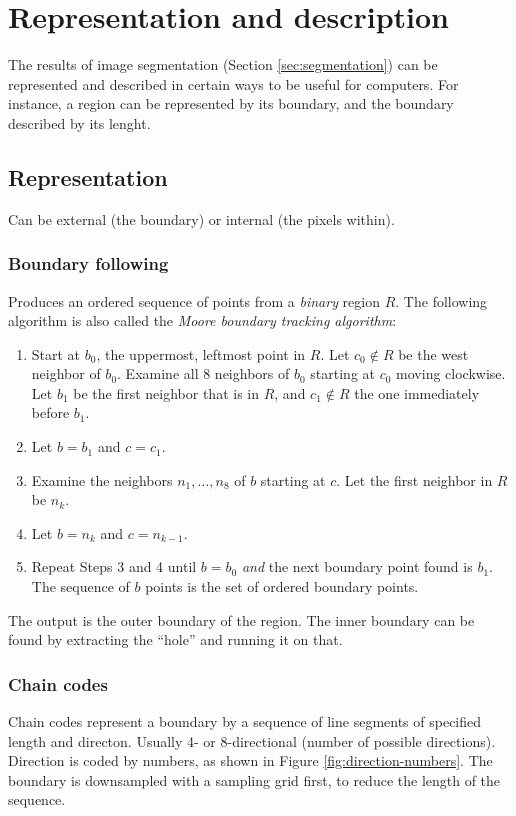 \section{Representation and description}
The results of image segmentation (Section \ref{sec:segmentation}) can be represented and described in certain ways to be useful for computers. For instance, a region can be represented by its boundary, and the boundary described by its lenght.

\subsection{Representation}
Can be external (the boundary) or internal (the pixels within).

\subsubsection{Boundary following}
Produces an ordered sequence of points from a \emph{binary} region $R$. The following algorithm is also called the \emph{Moore boundary tracking algorithm}:
\begin{enumerate}
    \item Start at $b_0$, the uppermost, leftmost point in $R$. Let $c_0 \notin R$ be the west neighbor of $b_0$. Examine all 8 neighbors of $b_0$ starting at $c_0$ moving clockwise. Let $b_1$ be the first neighbor that is in $R$, and $c_1 \notin R$ the one immediately before $b_1$.
    \item Let $b = b_1$ and $c = c_1$.
    \item Examine the neighbors $n_1, \dots, n_8$ of $b$ starting at $c$. Let the first neighbor in $R$ be $n_k$.
    \item Let $b = n_k$ and $c = n_{k-1}$.
    \item Repeat Steps 3 and 4 until $b = b_0$ \emph{and} the next boundary point found is $b_1$. The sequence of $b$ points is the set of ordered boundary points.
\end{enumerate}
The output is the outer boundary of the region. The inner boundary can be found by extracting the ``hole'' and running it on that.

\subsubsection{Chain codes}
Chain codes represent a boundary by a sequence of line segments of specified length and directon. Usually 4- or 8-directional (number of possible directions). Direction is coded by numbers, as shown in Figure \ref{fig:direction-numbers}. The boundary is downsampled with a sampling grid first, to reduce the length of the sequence.

